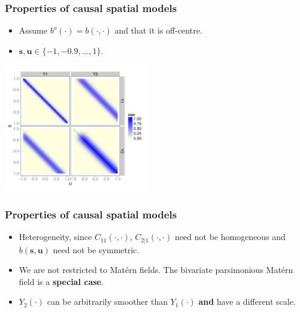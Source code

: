 \documentclass{beamer}
\newcommand{\svec} {\textbf{s}}
\newcommand{\uvec} {\textbf{u}}
\newcommand{\s}{\mathbf{s}}
\renewcommand{\u}{\mathbf{u}}
\begin{document}

\begin{frame}
\frametitle{Properties of causal spatial models}

\begin{itemize}
\item Assume $b^o(\cdot) = b(\cdot,\cdot)$ and that it is off-centre.
\item $\s,\u \in \{-1, -0.9 ,\dots, 1\}$.
\end{itemize}

\begin{center}
\includegraphics[width=2.5in]{Sigma.png}
\end{center}
\end{frame}


\begin{frame}
\frametitle{Properties of causal spatial models}

\begin{itemize}
\item Heterogeneity, since $C_{11}(\cdot,\cdot)$, $C_{2|1}(\cdot,\cdot)$ need not be homogeneous and $b(\svec,\uvec)$ need not be symmetric. \vfill

\item We are not restricted to Matérn fields. The bivariate parsimonious Matérn field is a {\bf special case}.\vfill

\item $Y_2(\cdot)$ can be arbitrarily smoother than $Y_1(\cdot)$ {\bf and} have a different scale.\vfill

\end{itemize}
\end{frame}

\end{document}

